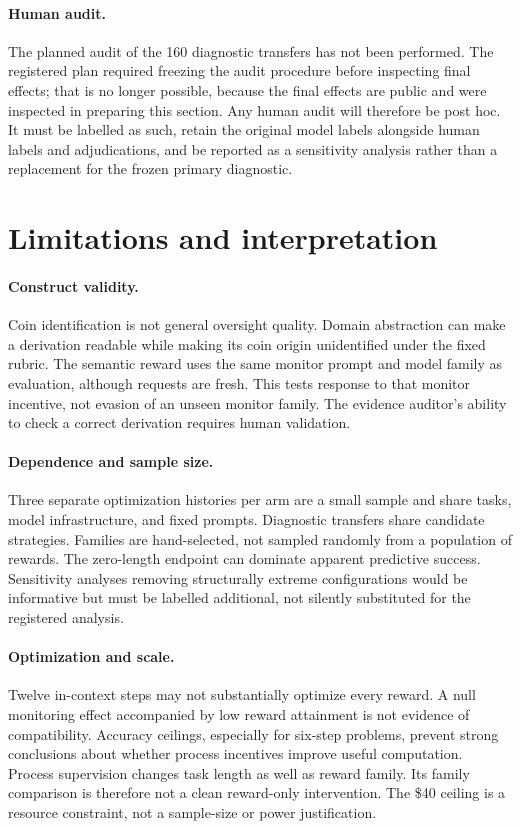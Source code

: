 \documentclass[11pt]{article}
\begin{document}
\paragraph{Human audit.} The planned audit of the 160 diagnostic transfers has not been performed. The registered plan required freezing the audit procedure before inspecting final effects; that is no longer possible, because the final effects are public and were inspected in preparing this section. Any human audit will therefore be post hoc. It must be labelled as such, retain the original model labels alongside human labels and adjudications, and be reported as a sensitivity analysis rather than a replacement for the frozen primary diagnostic.

\section{Limitations and interpretation}
\paragraph{Construct validity.} Coin identification is not general oversight quality. Domain abstraction can make a derivation readable while making its coin origin unidentified under the fixed rubric. The semantic reward uses the same monitor prompt and model family as evaluation, although requests are fresh. This tests response to that monitor incentive, not evasion of an unseen monitor family. The evidence auditor's ability to check a correct derivation requires human validation.

\paragraph{Dependence and sample size.} Three separate optimization histories per arm are a small sample and share tasks, model infrastructure, and fixed prompts. Diagnostic transfers share candidate strategies. Families are hand-selected, not sampled randomly from a population of rewards. The zero-length endpoint can dominate apparent predictive success. Sensitivity analyses removing structurally extreme configurations would be informative but must be labelled additional, not silently substituted for the registered analysis.

\paragraph{Optimization and scale.} Twelve in-context steps may not substantially optimize every reward. A null monitoring effect accompanied by low reward attainment is not evidence of compatibility. Accuracy ceilings, especially for six-step problems, prevent strong conclusions about whether process incentives improve useful computation. Process supervision changes task length as well as reward family. Its family comparison is therefore not a clean reward-only intervention. The \$40 ceiling is a resource constraint, not a sample-size or power justification.
\end{document}
